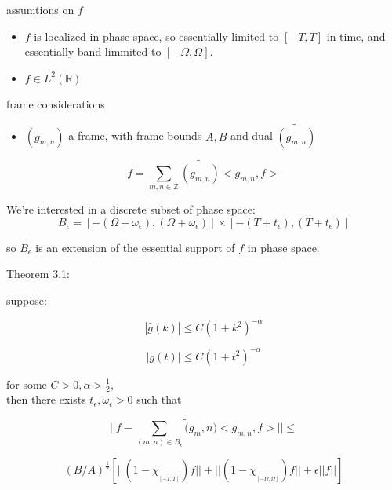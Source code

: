 \documentclass{beamer}
\newcommand{\ints}[0] { \mathbb{Z}}
\newcommand{\reals}[0] { \mathbb{R}}
\newcommand{\eps}[0] {  \epsilon }
\newcommand{\cf}[1] { \chi_{_{#1}}  }
\begin{document}
\begin{frame}

assumtions on $f$
\begin{itemize}
\item $f$ is localized in phase space, so essentially limited to $[-T,T]$ in time, and essentially band limmited to $[-\Omega, \Omega]$.  \\
\item $f \in L^2(\reals)$ \\
\end{itemize}

frame considerations
\begin{itemize}
\item $(g_{m,n})$ a frame, with frame bounds $A,B$ and dual $ \tilde{ ( g_{m,n}) } $\\
\end{itemize}

\begin{equation*}
f = \sum_{m,n \in \ints} \tilde{ ( g_{m,n}) } < g_{m,n}, f>
\end{equation*}

We're interested in a discrete subset of phase space:
\begin{equation*}
B_\eps = [-(\Omega + \omega_\eps), (\Omega + \omega_\eps)] \times [ -(T+t_\eps),(T+t_\eps)]
\end{equation*}

so $B_\eps$ is an extension of the essential support of $f$ in phase space.

\end{frame}




\begin{frame}

Theorem 3.1: 

suppose:

\begin{equation*}
|\hat g (k) | \le C  (1 + k^2)^{-\alpha }
\end{equation*}

\begin{equation*}
|g(t)| \le C (1+t^2)^{-\alpha} 
\end{equation*}

for some $C>0, \alpha > \frac{1}{2}$, \\
then there exists $t_\eps, \omega_\eps >0$ such that 

\begin{equation*}
||  f - \sum_{(m,n) \in B_\eps} \tilde( g_m,n)  <g_{m,n}, f > || \le 
\end{equation*}

\begin{equation*}
(B/A)^{\frac{1}{2}} \left[ ||(1-\cf{[-T,T]}) f|| + ||(1-\cf{[-\Omega, \Omega]})f||+  \eps ||f|| \right]
\end{equation*}


\end{frame}
\end{document}
